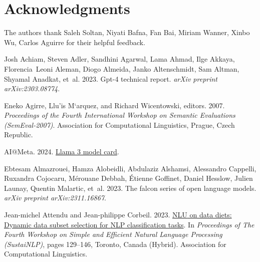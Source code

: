 \documentclass[11pt]{article}
\begin{document}
\section*{Acknowledgments}
The authors thank Saleh Soltan, Niyati Bafna, Fan Bai, Miriam Wanner, Xinbo Wu, Carlos Aguirre for their helpful feedback.

\begin{thebibliography}{88}
    \providecommand{\natexlab}[1]{#1}
    
    Josh Achiam, Steven Adler, Sandhini Agarwal, Lama Ahmad, Ilge Akkaya, Florencia~Leoni Aleman, Diogo Almeida, Janko Altenschmidt, Sam Altman, Shyamal Anadkat, et~al. 2023.
    \newblock Gpt-4 technical report.
    \newblock \emph{arXiv preprint arXiv:2303.08774}.
    
    Eneko Agirre, Llu'{i}s M`arquez, and Richard Wicentowski, editors. 2007.
    \newblock \emph{Proceedings of the Fourth International Workshop on Semantic Evaluations (SemEval-2007)}.
    \newblock Association for Computational Linguistics, Prague, Czech Republic.
    
    AI@Meta. 2024.
    \newblock \href {https://github.com/meta-llama/llama3/blob/main/MODEL_CARD.md} {Llama 3 model card}.
    
    Ebtesam Almazrouei, Hamza Alobeidli, Abdulaziz Alshamsi, Alessandro Cappelli, Ruxandra Cojocaru, M{\'e}rouane Debbah, {\'E}tienne Goffinet, Daniel Hesslow, Julien Launay, Quentin Malartic, et~al. 2023.
    \newblock The falcon series of open language models.
    \newblock \emph{arXiv preprint arXiv:2311.16867}.
    
    Jean-michel Attendu and Jean-philippe Corbeil. 2023.
    \newblock \href {https://doi.org/10.18653/v1/2023.sustainlp-1.9} {{NLU} on data diets: Dynamic data subset selection for {NLP} classification tasks}.
    \newblock In \emph{Proceedings of The Fourth Workshop on Simple and Efficient Natural Language Processing (SustaiNLP)}, pages 129--146, Toronto, Canada (Hybrid). Association for Computational Linguistics.
    

\end{thebibliography}
\end{document}

